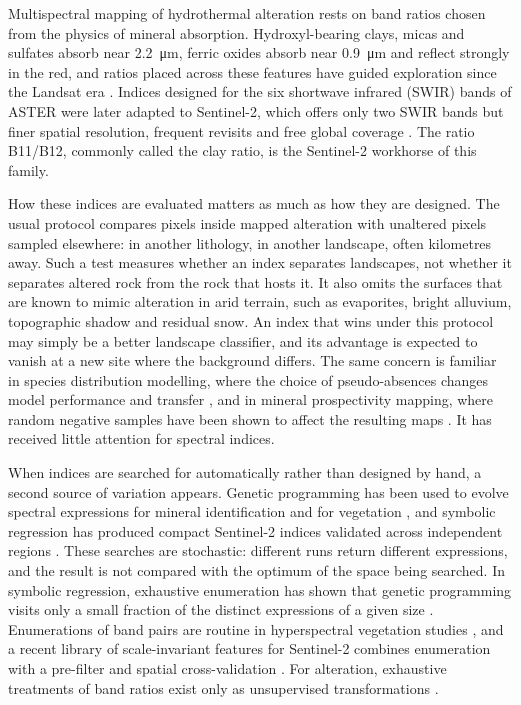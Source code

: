 \documentclass[preprint,authoryear,number]{elsarticle}
\begin{document}
Multispectral mapping of hydrothermal alteration rests on band ratios chosen from the physics of mineral absorption. Hydroxyl-bearing clays, micas and sulfates absorb near \SI{2.2}{\micro\meter}, ferric oxides absorb near \SI{0.9}{\micro\meter} and reflect strongly in the red, and ratios placed across these features have guided exploration since the Landsat era \citep{Sabins1999}. Indices designed for the six shortwave infrared (SWIR) bands of ASTER \citep{Ninomiya2005,Mars2006,Mars2010} were later adapted to Sentinel-2, which offers only two SWIR bands but finer spatial resolution, frequent revisits and free global coverage \citep{vanderMeer2014,vanderWerff2016,Pour2018}. The ratio B11/B12, commonly called the clay ratio, is the Sentinel-2 workhorse of this family.

How these indices are evaluated matters as much as how they are designed. The usual protocol compares pixels inside mapped alteration with unaltered pixels sampled elsewhere: in another lithology, in another landscape, often kilometres away. Such a test measures whether an index separates landscapes, not whether it separates altered rock from the rock that hosts it. It also omits the surfaces that are known to mimic alteration in arid terrain, such as evaporites, bright alluvium, topographic shadow and residual snow. An index that wins under this protocol may simply be a better landscape classifier, and its advantage is expected to vanish at a new site where the background differs. The same concern is familiar in species distribution modelling, where the choice of pseudo-absences changes model performance and transfer \citep{Phillips2009,BarbetMassin2012}, and in mineral prospectivity mapping, where random negative samples have been shown to affect the resulting maps \citep{Zuo2020,Zhang2025}. It has received little attention for spectral indices.

When indices are searched for automatically rather than designed by hand, a second source of variation appears. Genetic programming has been used to evolve spectral expressions for mineral identification \citep{Ross2005} and for vegetation \citep{Momm2011}, and symbolic regression has produced compact Sentinel-2 indices validated across independent regions \citep{Chrysostomou2026}. These searches are stochastic: different runs return different expressions, and the result is not compared with the optimum of the space being searched. In symbolic regression, exhaustive enumeration has shown that genetic programming visits only a small fraction of the distinct expressions of a given size \citep{Bartlett2024,Kronberger2024}. Enumerations of band pairs are routine in hyperspectral vegetation studies \citep{Thenkabail2000}, and a recent library of scale-invariant features for Sentinel-2 combines enumeration with a pre-filter and spatial cross-validation \citep{Lotfi2026}. For alteration, exhaustive treatments of band ratios exist only as unsupervised transformations \citep{Askari2018}.
\end{document}
